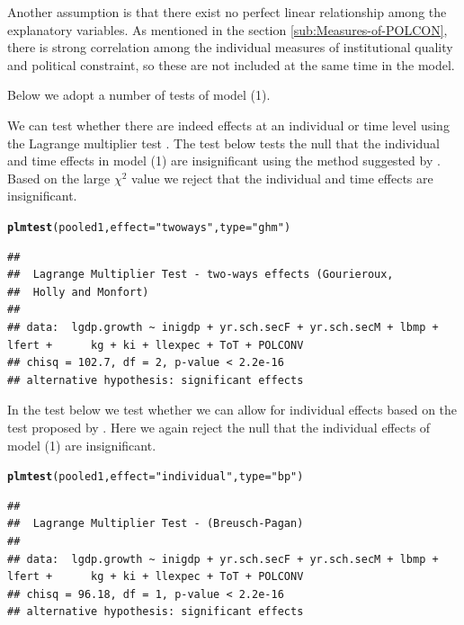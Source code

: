 \documentclass{article}\usepackage{graphicx, color}
\makeatletter
\newcommand{\hlfunctioncall}[1]{\textcolor[rgb]{0.501960784313725,0,0.329411764705882}{\textbf{#1}}}%
\newcommand{\hlstring}[1]{\textcolor[rgb]{0.6,0.6,1}{#1}}%
\newenvironment{kframe}{%
 \def\at@end@of@kframe{}%
 \ifinner\ifhmode%
  \def\at@end@of@kframe{\end{minipage}}%
  \begin{minipage}{\columnwidth}%
 \fi\fi%
 \def\FrameCommand##1{\hskip\@totalleftmargin \hskip-\fboxsep
 \colorbox{shadecolor}{##1}\hskip-\fboxsep
     \hskip-\linewidth \hskip-\@totalleftmargin \hskip\columnwidth}%
 \MakeFramed {\advance\hsize-\width
   \@totalleftmargin\z@ \linewidth\hsize
   \@setminipage}}%
 {\par\unskip\endMakeFramed%
 \at@end@of@kframe}
\newenvironment{knitrout}{}{} %
\makeatother
\begin{document}
Another assumption is that there exist no perfect linear relationship
among the explanatory variables. As mentioned in the section \vref{sub:Measures-of-POLCON},
there is strong correlation among the individual measures of institutional
quality and political constraint, so these are not included at the
same time in the model.

Below we adopt a number of tests of model (1).

We can test whether there are indeed effects at an individual or time
level using the Lagrange multiplier test \citep[p. 21]{croissant2008paneldata}.
The test below tests the null that the individual and time effects
in model (1) are insignificant using the method suggested by \citet{gourieroux1982likelihood}.
Based on the large $\chi^{2}$ value we reject that the individual
and time effects are insignificant.

\begin{knitrout}
\color{fgcolor}\begin{kframe}
\begin{alltt}
\hlfunctioncall{plmtest}(pooled1, effect = \hlstring{"twoways"}, type = \hlstring{"ghm"})
\end{alltt}
\begin{verbatim}
## 
## 	Lagrange Multiplier Test - two-ways effects (Gourieroux,
## 	Holly and Monfort)
## 
## data:  lgdp.growth ~ inigdp + yr.sch.secF + yr.sch.secM + lbmp + lfert +      kg + ki + llexpec + ToT + POLCONV 
## chisq = 102.7, df = 2, p-value < 2.2e-16
## alternative hypothesis: significant effects
\end{verbatim}
\end{kframe}
\end{knitrout}


In the test below we test whether we can allow for individual effects
based on the test proposed by \citet{breusch1980thelagrange}. Here
we again reject the null that the individual effects of model (1)
are insignificant.

\begin{knitrout}
\color{fgcolor}\begin{kframe}
\begin{alltt}
\hlfunctioncall{plmtest}(pooled1, effect = \hlstring{"individual"}, type = \hlstring{"bp"})
\end{alltt}
\begin{verbatim}
## 
## 	Lagrange Multiplier Test - (Breusch-Pagan)
## 
## data:  lgdp.growth ~ inigdp + yr.sch.secF + yr.sch.secM + lbmp + lfert +      kg + ki + llexpec + ToT + POLCONV 
## chisq = 96.18, df = 1, p-value < 2.2e-16
## alternative hypothesis: significant effects
\end{verbatim}
\end{kframe}
\end{knitrout}
\end{document}
